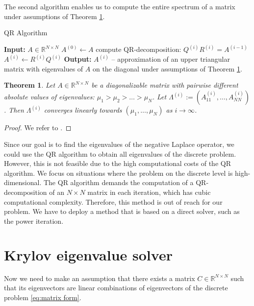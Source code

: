 \documentclass[a4paper,11pt,bibliography=totoc,listof=totoc,headinclude=true,cleardoublepage=empty,oneside]{scrbook}
\newtheorem{theorem}{Theorem}[chapter]
\newcommand{\R}{\mathbb{R}}
\begin{document}
The second algorithm enables us to compute the entire spectrum of a matrix under assumptions of Theorem \ref{theorem:QR alg}. 

\begin{algorithm}[H]
\caption{QR Algorithm}\label{alg:QR alg}
\begin{algorithmic}
    \State \textbf{Input:} $A \in \R^{N \times N}$
    \State $A^{(0)} \gets A$
        \State compute QR-decomposition: $Q^{(i)} R^{(i)} = A^{(i-1)}$ 
        \State $A^{(i)} \gets R^{(i)}Q^{(i)}$
    \EndFor
    \State \textbf{Output:} $A^{(i)}$ -- approximation of an upper triangular matrix with eigenvalues of $A$ on the diagonal under assumptions of Theorem \ref{theorem:QR alg}. 
    \end{algorithmic}
\end{algorithm}

\begin{theorem}\label{theorem:QR alg}
    Let $A \in \R^{N \times N}$ be a diagonalizable matrix with pairwise different absolute values of eigenvalues: $\mu_1 > \mu_2 > \dots > \mu_N$. Let $\Lambda^{(i)} := \left(A^{(i)}_{11}, \dots, A^{(i)}_{NN}\right)$. Then $\Lambda^{(i)}$ converges linearly towards $(\mu_1, \dots, \mu_N)$ as $i\rightarrow\infty$. 
\end{theorem}

\begin{proof}
    We refer to \cite[p. 120]{numericsAB}.
\end{proof}

Since our goal is to find the eigenvalues of the negative Laplace operator, we could use the QR algorithm to obtain all eigenvalues of the discrete problem. However, this is not feasible due to the high computational costs of the QR algorithm. We focus on situations where the problem on the discrete level is high-dimensional. The QR algorithm demands the computation of a QR-decomposition of an $N \times N$ matrix in each iteration, which has cubic computational complexity. Therefore, this method is out of reach for our problem. We have to deploy a method that is based on a direct solver, such as the power iteration. 

\section{Krylov eigenvalue solver}

Now we need to make an assumption that there exists a matrix $C\in \R^{N \times N}$ such that its eigenvectors are linear combinations of eigenvectors of the discrete problem \eqref{eq:matrix form}. 
\end{document}
